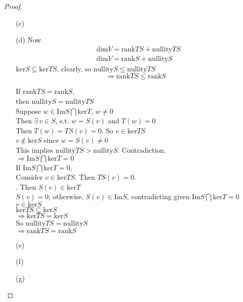 \documentclass[10pt]{amsart}
\begin{document}
\begin{multicols*}{2}
\begin{proof}
\begin{enumerate}
		\item[(c)]
		\item[(d)] Now 
		\[
		\begin{aligned}
		& \text{dim}V = \text{rank}TS + \text{nullity}TS \\ 
		&  \text{dim}V = \text{rank}S + \text{nullity}S
		\end{aligned}
		\]
		$\text{ker}S \subseteq \text{ker}TS$, clearly, so $\text{nullity}S \leq \text{nullity}TS$ 
		\[
		\Longrightarrow \boxed{ \text{rank}TS \leq \text{rank}S } 
		\]
		
		If $\text{rank}TS = \text{rank}S$, \\
		\phantom{ \quad } then $\text{nullity}S = \text{nullity}TS$ \\
		\phantom{ \, } Suppose $w \in \text{Im}S \bigcap \text{ker}T$, $w \neq 0$ \\
		\phantom{ \quad } Then $\exists \,  v\in S$, s.t. $w = S(v)$ and $T(w)=0$ \\
		\phantom{ \quad \, } Then $T(w) = TS(v) =0$.  So $v\in \text{ker}TS$ \\
		\phantom{ \quad \quad \, } $v\notin \text{ker}S$ since $w = S(v) \neq 0$ \\
		\phantom{ \quad \quad \, } This implies $\text{nullity}TS > \text{nullity}S$.  Contradiction. \\
		$\Longrightarrow \text{Im}S \bigcap \text{ker}T =0$ \\
		
		If $\text{Im}S \bigcap \text{ker}T =0$, \\
		\phantom{ \quad } Consider $v \in \text{ker}TS$.  Then $TS(v)=0$.  \\
		.  Then $S(v)  \in \text{ker}T$ \\
		\phantom{ \quad  } $S(v) =0$; otherwise, $S(v) \in \text{Im}S$, contradicting given $\text{Im}S \bigcap \text{ker}T =0$ \\
		\phantom{ \quad \quad } $v\in \text{ker}S$ \\
		
		$\text{ker}TS \subseteq \text{ker}S$\\
		$\Longrightarrow \text{ker}TS = \text{ker}S$ \\
		So $\text{nullity}TS = \text{nullity}S$  \\
		$\Longrightarrow \text{rank}TS = \text{rank}S$ 
		
		\item[(e)]
		\item[(f)]
		\item[(g)]
	\end{enumerate}
\end{proof}



\end{multicols*}
\end{document}
